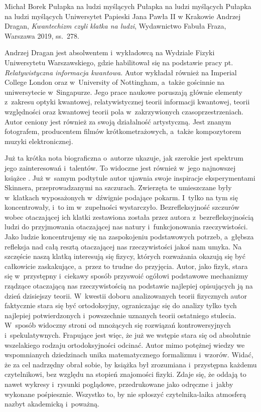 \begin{newrevplenv}{Michał Borek}
	{Pułapka na ludzi myślących}
	{Pułapka na ludzi myślących}
	{Pułapka na ludzi myślących}
	{Uniwersytet Papieski Jana Pawła II w Krakowie}
	{Andrzej Dragan, \textit{Kwantechizm czyli klatka na ludzi}, Wydawnictwo Fabuła Fraza, Warszawa 2019, ss.~278.}


\lettrine[loversize=0.13,lines=2,lraise=-0.03,nindent=0em,findent=0.2pt]%
{A}{}ndrzej Dragan jest absolwentem i~wykładowcą na Wydziale Fizyki Uniwersytetu Warszawskiego, gdzie habilitował się na podstawie pracy pt. \textit{Relatywistyczna informacja kwantowa}. Autor wykładał również na Imperial College London oraz w~University of Nottingham, a~także gościnnie na uniwersytecie w~Singapurze. Jego prace naukowe poruszają głównie elementy z~zakresu optyki kwantowej, relatywistycznej teorii informacji kwantowej, teorii względności oraz kwantowej teorii pola w~zakrzywionych czasoprzestrzeniach. Autor ceniony jest również za swoją działalność artystyczną. Jest znanym fotografem, producentem filmów krótkometrażowych, a~także kompozytorem muzyki elektronicznej.

Już ta krótka nota biograficzna o~autorze ukazuje, jak szerokie jest spektrum jego zainteresowań i~talentów. To widoczne jest również w~jego najnowszej książce
\parencite[][]{dragan_kwantechizm_2019}. %
 Już w~samym podtytule autor ujawnia swoje inspiracje eksperymentami Skinnera, przeprowadzanymi na szczurach. Zwierzęta te umieszczane były w~klatkach wyposażonych w~dźwignie podające pokarm. I~tylko na tym się koncentrowały, i~to im w~zupełności wystarczyło. Bezrefleksyjność szczurów wobec otaczającej ich klatki zestawiona została przez autora z~bezrefleksyjnością ludzi do przyjmowania otaczającej nas natury i~funkcjonowania rzeczywistości. Jako ludzie koncentrujemy się na zaspokojeniu podstawowych potrzeb, a~głębsza refleksja nad całą resztą otaczającej nas rzeczywistości jakoś nam umyka. Na szczęście naszą klatką interesują się fizycy, których rozważania okazują się być całkowicie zaskakujące, a~przez to trudne do przyjęcia. Autor, jako fizyk, stara się w~przystępny i~ciekawy sposób przyswoić ogółowi podstawowe mechanizmy rządzące otaczającą nas rzeczywistością na podstawie najlepiej opisujących ją na dzień dzisiejszy teorii. W~kwestii doboru analizowanych teorii fizycznych autor faktycznie stara się być ortodoksyjny, ograniczając się do analizy tylko tych najlepiej potwierdzonych i~powszechnie uznanych teorii ostatniego stulecia. W~sposób widoczny stroni od mnożących się rozwiązań kontrowersyjnych i~spekulatywnych. Frapujące jest więc, że już we wstępie stara się od absolutnie wszelakiego rodzaju ortodoksyjności odcinać. Autor mimo potężnej wiedzy we wspomnianych dziedzinach unika matematycznego formalizmu i~wzorów. Widać, że za cel nadrzędny obrał sobie, by książka był zrozumiana i~przystępna każdemu czytelnikowi, bez względu na stopień znajomości fizyki. Zdaje się, że oddają to nawet wykresy i~rysunki poglądowe, przedrukowane jako odręczne i~jakby wykonane pośpiesznie. Wszystko to, by nie spłoszyć czytelnika-laika atmosferą nazbyt akademicką i~poważną.


\end{newrevplenv}
